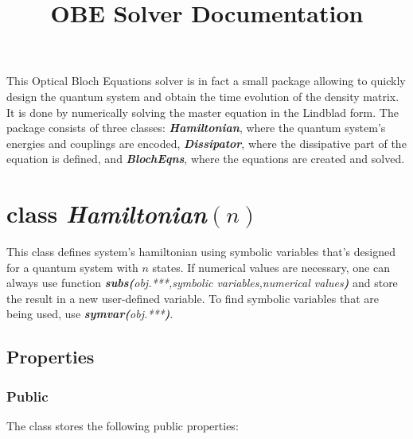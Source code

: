 \documentclass{article}
\title{OBE Solver Documentation}
\numberwithin{equation}{section}
\numberwithin{figure}{section}
\numberwithin{table}{section}
\newcommand\codefun[2]{\textit{\textbf{#1(}#2\textbf{)}}}
\newcommand\codeclass[1]{\ttfamily\textbf{\textit{#1}}\rmfamily}
\begin{document}
\maketitle





This Optical Bloch Equations solver is in fact a small package allowing to quickly design the quantum system and obtain the time evolution of the density matrix. It is done by numerically solving the master equation in the Lindblad form. The package consists of three classes: \codeclass{Hamiltonian}, where the quantum system's energies and couplings are encoded, \codeclass{Dissipator}, where the dissipative part of the equation is defined, and \codeclass{BlochEqns}, where the equations are created and solved.

\section*{\textbf{class} \codeclass{Hamiltonian}$(n)$}

This class defines system's hamiltonian using symbolic variables that's designed for a quantum system with $n$ states. If numerical values are necessary, one can always use function \codefun{subs}{obj.***,symbolic variables,numerical values} and store the result in a new user-defined variable. To find symbolic variables that are being used, use \codefun{symvar}{obj.***}.

\subsection*{Properties}

\subsubsection*{Public}

The class stores the following public properties:
\end{document}
